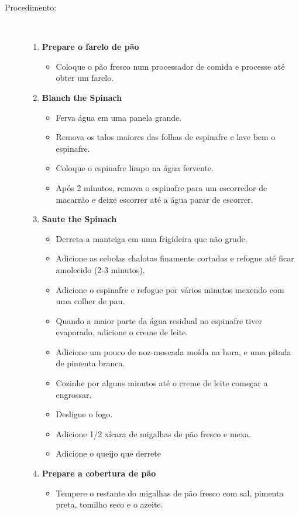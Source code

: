 \documentclass [11pt, letterpaper] {article}
\begin{document}
\begin {description}
\item [Procedimento:] \ \\
\begin {enumerate}
\item {\bf Prepare o farelo de p\~ao}
	\begin{itemize}
	\item Coloque o p\~ao fresco num processador de comida e processe at\'e obter um farelo.
	\end{itemize}
\item {\bf Blanch the Spinach}
	\begin {itemize}
	\item Ferva \'agua em uma panela grande.
        \item Remova os talos maiores das folhas de espinafre e lave bem o espinafre.
	\item Coloque o espinafre limpo na água fervente.
	\item Após 2 minutos, remova o espinafre para um escorredor de macarrão e deixe escorrer até a água parar de escorrer.
	\end {itemize}
\item {\bf Saute the Spinach}
\begin {itemize}
\item Derreta a manteiga em uma frigideira que n\~ao grude.
\item Adicione as cebolas chalotas finamente cortadas e refogue até ficar amolecido (2-3 minutos).
\item Adicione o espinafre e refogue por vários minutos mexendo com uma colher de pau.
\item Quando a maior parte da água residual no espinafre tiver evaporado, adicione o creme de leite.
\item Adicione um pouco de noz-moscada mo\'ida na hora, e uma pitada de pimenta branca.
\item Cozinhe por alguns minutos até o creme de leite começar a engrossar.
\item Desligue o fogo.
\item Adicione 1/2 xícara de migalhas de pão fresco e mexa.
\item Adicione o queijo que derrete
\end {itemize}
\item {\bf Prepare a cobertura de pão}
\begin {itemize}
\item Tempere o restante do migalhas de pão fresco com sal, pimenta preta, tomilho seco e o azeite.
\end {itemize}


\end{enumerate}
\end{description}
\end{document}
